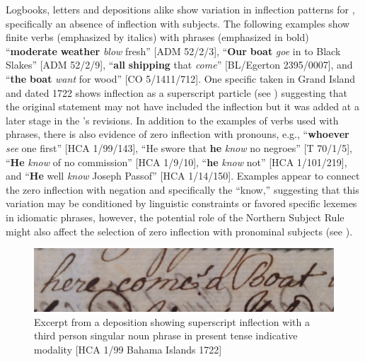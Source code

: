 Logbooks, letters and depositions alike show variation in inflection patterns for  , specifically an absence of inflection with  subjects. The following examples show  finite verbs (emphasized by italics) with   phrases (emphasized in bold) “\textbf{moderate} \textbf{weather} \textit{blow} fresh” [ADM 52/2/3], “\textbf{Our} \textbf{boat} \textit{goe} in to Black Slakes” [ADM 52/2/9], “\textbf{all} \textbf{shipping} that \textit{come}” [BL/Egerton 2395/0007], and “\textbf{the} \textbf{boat} \textit{want} for wood” [CO 5/1411/712]. One specific  taken in Grand  Island and dated 1722 shows inflection as a superscript particle (see ) suggesting that the original statement may not have included the inflection but it was added at a later stage in the ’s revisions. In addition to the examples of verbs used with   phrases, there is also evidence of zero inflection with  pronouns, e.g., “\textbf{whoever} \textit{see} one first” [HCA 1/99/143], “He swore that \textbf{he} \textit{know} no negroes” [T 70/1/5], “\textbf{He} \textit{know} of no commission” [HCA 1/9/10], “\textbf{he} \textit{know} not” [HCA 1/101/219], and “\textbf{He} well \textit{know} Joseph Passof” [HCA 1/14/150]. Examples appear to connect the zero inflection with negation and specifically the  “know,” suggesting that this variation may be conditioned by linguistic constraints or favored specific lexemes in idiomatic phrases, however, the potential role of the Northern Subject Rule might also affect the selection of zero inflection with  pronominal subjects (see  \citealt{deHaas2006}). 

 
\begin{figure} 
\includegraphics[width=\textwidth]{figures/delgado-img16.png}

\caption{\label{fig:key:6.2} Excerpt from a deposition showing superscript inflection with a third person singular noun phrase in present tense indicative modality [HCA 1/99 Bahama {Islands 1722}]}
\end{figure}


